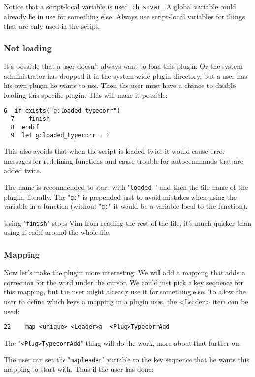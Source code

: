 Notice that a script-local variable is used |\verb!:h s:var!|.
A global variable could already be in use for something else.
Always use script-local variables for things that are only used in the script.

\subsubsection{Not loading}
It's possible that a user doesn't always want to load this plugin.
Or the system administrator has dropped it in the system-wide plugin directory, but a user has his own plugin he wants to use.
Then the user must have a chance to disable loading this specific plugin.
This will make it possible:

\begin{Verbatim}[samepage=true]
  6  if exists("g:loaded_typecorr")
  7    finish
  8  endif
  9  let g:loaded_typecorr = 1
\end{Verbatim}

This also avoids that when the script is loaded twice it would cause error messages for redefining functions and cause trouble for autocommands that are added twice.

The name is recommended to start with "\verb!loaded_!" and then the file name of the plugin, literally.
The "\verb!g:!" is prepended just to avoid mistakes when using the variable in a function (without "\verb!g:!" it would be a variable local to the function).

Using "\verb!finish!" stops Vim from reading the rest of the file, it's much quicker than using if-endif around the whole file.

\subsubsection{Mapping}
Now let's make the plugin more interesting: We will add a mapping that adds a correction for the word under the cursor.
We could just pick a key sequence for this mapping, but the user might already use it for something else.
To allow the user to define which keys a mapping in a plugin uses, the <Leader> item can be used:

\begin{Verbatim}[samepage=true]
 22    map <unique> <Leader>a  <Plug>TypecorrAdd
\end{Verbatim}

The "\verb!<Plug>TypecorrAdd!" thing will do the work, more about that further on.

The user can set the "\verb!mapleader!" variable to the key sequence that he wants this mapping to start with.
Thus if the user has done:

